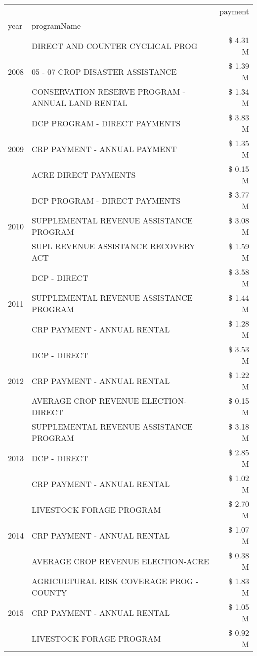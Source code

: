 \begin{tabular}{llr}
\toprule
 &  & payment \\
year & programName &  \\
\midrule
\multirow[t]{3}{*}{2008} & DIRECT AND COUNTER CYCLICAL PROG & \$ 4.31 M \\
 & 05 - 07 CROP DISASTER ASSISTANCE & \$ 1.39 M \\
 & CONSERVATION RESERVE PROGRAM - ANNUAL LAND RENTAL & \$ 1.34 M \\
\cline{1-3}
\multirow[t]{3}{*}{2009} & DCP PROGRAM - DIRECT PAYMENTS & \$ 3.83 M \\
 & CRP PAYMENT - ANNUAL PAYMENT & \$ 1.35 M \\
 & ACRE DIRECT PAYMENTS & \$ 0.15 M \\
\cline{1-3}
\multirow[t]{3}{*}{2010} & DCP PROGRAM - DIRECT PAYMENTS & \$ 3.77 M \\
 & SUPPLEMENTAL REVENUE ASSISTANCE PROGRAM & \$ 3.08 M \\
 & SUPL REVENUE ASSISTANCE RECOVERY ACT & \$ 1.59 M \\
\cline{1-3}
\multirow[t]{3}{*}{2011} & DCP - DIRECT & \$ 3.58 M \\
 & SUPPLEMENTAL REVENUE ASSISTANCE PROGRAM & \$ 1.44 M \\
 & CRP PAYMENT - ANNUAL RENTAL & \$ 1.28 M \\
\cline{1-3}
\multirow[t]{3}{*}{2012} & DCP - DIRECT & \$ 3.53 M \\
 & CRP PAYMENT - ANNUAL RENTAL & \$ 1.22 M \\
 & AVERAGE CROP REVENUE ELECTION-DIRECT & \$ 0.15 M \\
\cline{1-3}
\multirow[t]{3}{*}{2013} & SUPPLEMENTAL REVENUE ASSISTANCE PROGRAM & \$ 3.18 M \\
 & DCP - DIRECT & \$ 2.85 M \\
 & CRP PAYMENT - ANNUAL RENTAL & \$ 1.02 M \\
\cline{1-3}
\multirow[t]{3}{*}{2014} & LIVESTOCK FORAGE PROGRAM & \$ 2.70 M \\
 & CRP PAYMENT - ANNUAL RENTAL & \$ 1.07 M \\
 & AVERAGE CROP REVENUE ELECTION-ACRE & \$ 0.38 M \\
\cline{1-3}
\multirow[t]{3}{*}{2015} & AGRICULTURAL RISK COVERAGE PROG - COUNTY & \$ 1.83 M \\
 & CRP PAYMENT - ANNUAL RENTAL & \$ 1.05 M \\
 & LIVESTOCK FORAGE PROGRAM & \$ 0.92 M \\
\cline{1-3}

\end{tabular}
